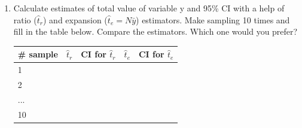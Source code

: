 \documentclass[12pt]{article}
\begin{document}
\begin{enumerate}
\item Calculate estimates of total value of variable y and 95\% CI with a help of ratio ($\hat{t}_r$) and expansion ($\hat{t}_{e} = N\bar{y}$) estimators. Make sampling 10 times and fill in the table below. Compare the estimators. Which one would you prefer?\\
\begin{center}
\begin{tabular}{l||c|c|c|c}
\# sample & $\hat{t}_r$ & CI for $\hat{t}_r$ & $\hat{t}_{e}$ & CI for $\hat{t}_{e}$ \\
\hline
\hline
1&&&&\\
\hline
2&&&&\\
\hline
...&&&&\\
\hline
10&&&&\\
\end{tabular}
\end{center}


\end{enumerate}
\end{document}
